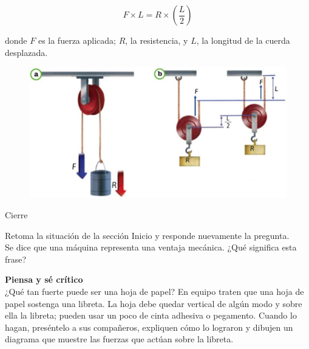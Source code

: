 \documentclass[11pt]{book}
\begin{document}
\begin{equation}
  F \times L = R \times \left(\frac{L}{2}\right)
\end{equation}

donde $F$ es la fuerza aplicada; $R$, la resistencia, y $L$, la longitud de la cuerda desplazada.

\begin{figure}[H]
  \centering
  \includegraphics[width=0.9\linewidth]{poleas_fijas.jpg}
  \label{fig:poleas_fijas}
\end{figure}


\begin{boxF}
  \begin{center}\color{colorrds}\large Cierre\end{center}
  Retoma la situación de la sección Inicio y responde nuevamente la pregunta.\\
  Se dice que una máquina representa una ventaja mecánica. ¿Qué significa esta frase?
\end{boxF}


\begin{boxH}
  \textbf{Piensa y sé crítico}\\
  ¿Qué tan fuerte puede ser una hoja de papel? En equipo traten que una hoja de
  papel sostenga una libreta. La hoja debe quedar vertical de algún modo y sobre
  ella la libreta; pueden usar un poco de cinta adhesiva o pegamento. Cuando lo hagan,
  preséntelo a sus compañeros, expliquen cómo lo lograron y dibujen un diagrama que
  muestre las fuerzas que actúan sobre la libreta.
\end{boxH}
\newpage
\end{document}
